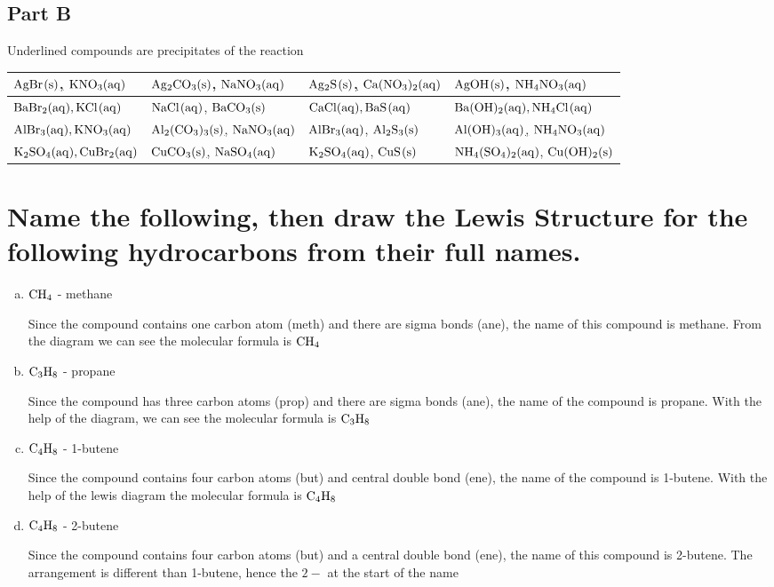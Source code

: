\documentclass{scrartcl}
\begin{document}
\subsection{Part B}
\label{sec:orge29ea0b}
Underlined compounds are precipitates of the reaction
\begin{center}
\begin{tabular}{llll}
\toprule
\uline{\(\ce{AgBr(s)}\),} \(\ce{KNO3(aq)}\) & \uline{\(\ce{Ag2CO3(s)}\)}, \(\ce{NaNO3(aq)}\) & \uline{\(\ce{Ag2S(s)}\),}  \(\ce{Ca(NO3)2(aq)}\) & \uline{\(\ce{AgOH(s)}\)}, \(\ce{NH4NO3(aq)}\)\\
\midrule
\(\ce{BaBr2(aq), KCl(aq)}\) & \(\ce{NaCl(aq)}\), \uline{\(\ce{BaCO3(s)}\)} & \(\ce{CaCl(aq), BaS(aq)}\) & \(\ce{Ba(OH)2(aq), NH4Cl(aq)}\)\\
\midrule
\(\ce{AlBr3(aq), KNO3(aq)}\) & \uline{\(\ce{Al2(CO3)3(s)}\),} \(\ce{NaNO3(aq)}\) & \(\ce{AlBr3(aq)}\), \uline{\(\ce{Al2S3(s)}\)} & \uline{\(\ce{Al(OH)3(aq)}\),} \(\ce{NH4NO3(aq)}\)\\
\midrule
\(\ce{K2SO4(aq), CuBr2(aq)}\) & \uline{\(\ce{CuCO3(s)}\),} \(\ce{NaSO4(aq)}\) & \(\ce{K2SO4(aq)}\), \uline{\(\ce{CuS(s)}\)} & \(\ce{NH4(SO4)2(aq)}\), \uline{\(\ce{Cu(OH)2(s)}\)}\\
\bottomrule
\end{tabular}
\end{center}

\section{Name the following, then draw the Lewis Structure for the following hydrocarbons from their full names.}
\label{sec:org7609b8d}
\begin{enumerate}[a.]
\item \(\ce{CH4}\) - methane

Since the compound contains one carbon atom (meth) and there are sigma bonds
(ane), the name of this compound is methane. From the diagram we can see the
molecular formula is    \(\ce{CH4}\)

\item \(\ce{C3H8}\) - propane

Since the compound has three carbon atoms (prop) and there are sigma bonds
(ane), the name of the compound is propane. With the help of the diagram, we
can see the molecular formula is    \(\ce{C3H8}\)

\item \(\ce{C4H8}\) - 1-butene

Since the compound contains four carbon atoms (but) and central double bond
(ene), the name of the compound is 1-butene. With the help of the lewis
diagram the molecular formula is \(\ce{C4H8}\)

\item \(\ce{C4H8}\) - 2-butene

Since the compound contains four carbon atoms (but) and a central double bond
(ene), the name of this compound is 2-butene. The arrangement is different
than 1-butene, hence the \(2-\) at the start of the name
\end{enumerate}
\end{document}
